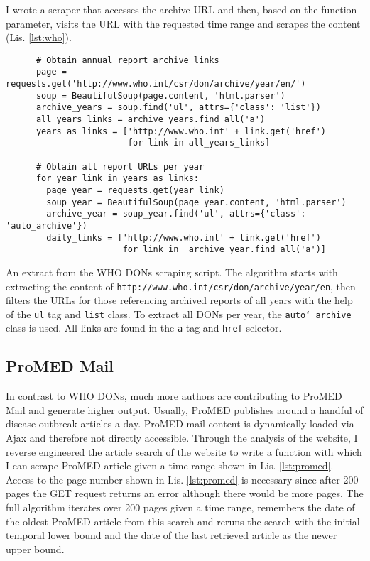   I wrote a scraper that accesses the archive URL and then, based on the function parameter, visits the URL with the requested time range and scrapes the content (Lis. \ref{lst:who}).

  \begin{listing}[h]
    \begin{verbatim}
      # Obtain annual report archive links
      page = requests.get('http://www.who.int/csr/don/archive/year/en/')
      soup = BeautifulSoup(page.content, 'html.parser')
      archive_years = soup.find('ul', attrs={'class': 'list'})
      all_years_links = archive_years.find_all('a')
      years_as_links = ['http://www.who.int' + link.get('href')
                        for link in all_years_links]

      # Obtain all report URLs per year
      for year_link in years_as_links:
        page_year = requests.get(year_link)
        soup_year = BeautifulSoup(page_year.content, 'html.parser')
        archive_year = soup_year.find('ul', attrs={'class': 'auto_archive'})
        daily_links = ['http://www.who.int' + link.get('href')
                       for link in  archive_year.find_all('a')]
    \end{verbatim}
    \caption{An extract from the WHO DONs scraping script. The algorithm starts with extracting the content of \textquotesingle \texttt{http://www.who.int/csr/don/archive/year/en}\textquotesingle, then filters the URLs for those referencing archived reports of all years with the help of the \texttt{ul} tag and \texttt{list} class. To extract all DONs per year, the \texttt{auto\char`_archive} class is used. All links are found in the \texttt{a} tag and \texttt{href} selector.}
    \label{lst:who}
  \end{listing}

\subsection{ProMED Mail}
  In contrast to WHO DONs, much more authors are contributing to ProMED Mail and generate higher output.
  Usually, ProMED publishes around a handful of disease outbreak articles a day.
  ProMED mail content is dynamically loaded via Ajax and therefore not directly accessible.
  Through the analysis of the website, I reverse engineered the article search of the website to write a function with which I can scrape ProMED article given a time range shown in Lis. \ref{lst:promed}.
  Access to the page number shown in Lis. \ref{lst:promed} is necessary since after 200 pages the GET request returns an error although there would be more pages.
  The full algorithm iterates over 200 pages given a time range, remembers the date of the oldest ProMED article from this search and reruns the search with the initial temporal lower bound and the date of the last retrieved article as the newer upper bound.

